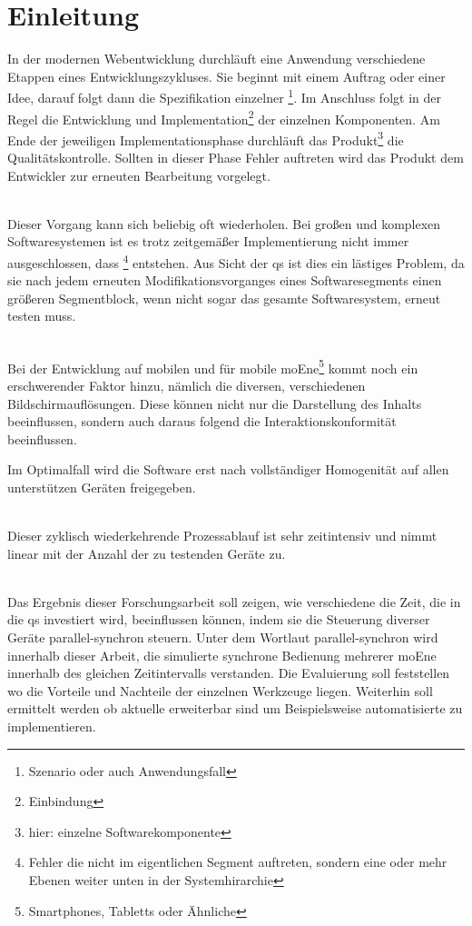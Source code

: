 \chapter{Einleitung}

In der modernen Webentwicklung durchläuft eine Anwendung verschiedene Etappen eines Entwicklungszykluses. Sie beginnt mit einem Auftrag oder einer Idee, darauf folgt dann die Spezifikation einzelner \footnote{Szenario oder auch Anwendungsfall}. Im Anschluss folgt in der Regel die Entwicklung und Implementation\footnote{Einbindung} der einzelnen Komponenten. Am Ende der jeweiligen Implementationsphase durchläuft das Produkt\footnote{hier: einzelne Softwarekomponente} die Qualitätskontrolle. Sollten in dieser Phase Fehler auftreten wird das Produkt dem Entwickler zur erneuten Bearbeitung vorgelegt.

\\Dieser Vorgang kann sich beliebig oft wiederholen. Bei großen und komplexen Softwaresystemen ist es trotz zeitgemäßer Implementierung nicht immer ausgeschlossen, dass \footnote{Fehler die nicht im eigentlichen Segment auftreten, sondern eine oder mehr Ebenen weiter unten in der Systemhirarchie} entstehen. Aus Sicht der \Gls{qs} ist dies ein lästiges Problem, da sie  nach jedem erneuten Modifikationsvorganges eines Softwaresegments einen größeren Segmentblock, wenn nicht sogar das gesamte Softwaresystem, erneut testen muss.

\\Bei der Entwicklung auf mobilen und für mobile \Gls{moEn}e\footnote{Smartphones, \Gls{Tablet}ts  oder Ähnliche} kommt noch ein erschwerender Faktor hinzu, nämlich die diversen, verschiedenen Bildschirmauflösungen. Diese können nicht nur die Darstellung des Inhalts beeinflussen, sondern auch daraus folgend die Interaktionskonformität beeinflussen.


Im Optimalfall wird die Software erst nach vollständiger Homogenität auf allen unterstützen Geräten freigegeben.

\\Dieser zyklisch wiederkehrende Prozessablauf ist sehr zeitintensiv und nimmt linear mit der Anzahl der zu testenden Geräte zu.

\\Das Ergebnis dieser Forschungsarbeit soll zeigen, wie verschiedene  die Zeit, die in die \Gls{qs} investiert wird, beeinflussen können, indem sie die Steuerung diverser Geräte \Gls{parallel-synchron} steuern. Unter dem Wortlaut \Gls{parallel-synchron} wird innerhalb dieser Arbeit, die simulierte synchrone Bedienung mehrerer \Gls{moEn}e innerhalb des gleichen Zeitintervalls verstanden. Die Evaluierung soll feststellen wo die Vorteile und Nachteile der einzelnen Werkzeuge liegen. Weiterhin soll ermittelt werden ob aktuelle  erweiterbar sind um Beispielsweise automatisierte  zu implementieren. 




